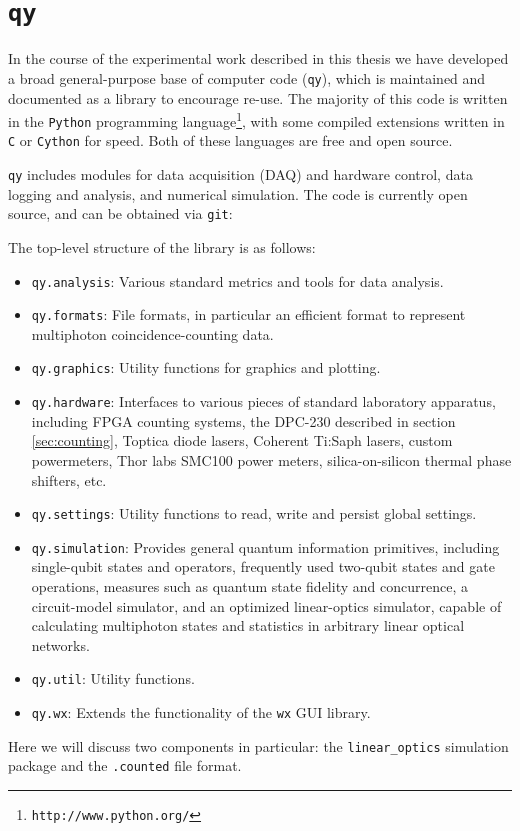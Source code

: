 \newcommand{\qy}{\texttt{qy}\xspace}
\chapter{\qy}
\label{app:qy}

In the course of the experimental work described in this thesis we have developed a broad general-purpose base of computer code (\qy), which is maintained and documented as a library to encourage re-use. The majority of this code is written in the \texttt{Python} programming language\footnote{\texttt{http://www.python.org/}}, with some compiled extensions written in \texttt{C} or \texttt{Cython} for speed. Both of these languages are free and open source.

\qy includes modules for data acquisition (DAQ) and hardware control, data logging and analysis, and numerical simulation. The code is currently open source, and can be obtained via \texttt{git}:
\begin{center}
\par
\end{center}
The top-level structure of the library is as follows:
\begin{itemize}
    \item \texttt{qy.analysis}: Various standard metrics and tools for data analysis.
    \item \texttt{qy.formats}: File formats, in particular an efficient format to represent multiphoton coincidence-counting data.
    \item \texttt{qy.graphics}: Utility functions for graphics and plotting.
    \item \texttt{qy.hardware}: Interfaces to various pieces of standard laboratory apparatus, including FPGA counting systems, the DPC-230 described in section \ref{sec:counting}, Toptica diode lasers, Coherent Ti:Saph lasers, custom powermeters, Thor labs SMC100 power meters, silica-on-silicon thermal phase shifters, etc.
    \item \texttt{qy.settings}: Utility functions to read, write and persist global settings.
    \item \texttt{qy.simulation}: Provides general quantum information primitives, including single-qubit states and operators, frequently used two-qubit states and gate operations, measures such as quantum state fidelity and concurrence, a circuit-model simulator, and an optimized linear-optics simulator, capable of calculating multiphoton states and statistics in arbitrary linear optical networks.
    \item \texttt{qy.util}: Utility functions.
    \item \texttt{qy.wx}: Extends the functionality of the \texttt{wx} GUI library.
\end{itemize}
Here we will discuss two components in particular: the \texttt{linear\_optics} simulation package and the \texttt{.counted} file format.

